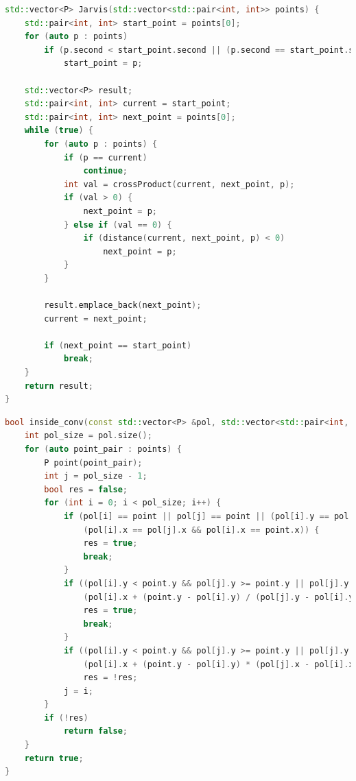 \documentclass[a4paper, 12pt]{article}
\begin{document}
\bigbreak

\begin{lstlisting}[language=C++,caption=Синхронная версия Джарвиса]
std::vector<P> Jarvis(std::vector<std::pair<int, int>> points) {
    std::pair<int, int> start_point = points[0];
    for (auto p : points)
        if (p.second < start_point.second || (p.second == start_point.second && p.first < start_point.first))
            start_point = p;

    std::vector<P> result;
    std::pair<int, int> current = start_point;
    std::pair<int, int> next_point = points[0];
    while (true) {
        for (auto p : points) {
            if (p == current)
                continue;
            int val = crossProduct(current, next_point, p);
            if (val > 0) {
                next_point = p;
            } else if (val == 0) {
                if (distance(current, next_point, p) < 0)
                    next_point = p;
            }
        }

        result.emplace_back(next_point);
        current = next_point;

        if (next_point == start_point)
            break;
    }
    return result;
}
\end{lstlisting}

\newpage
\begin{lstlisting}[language=C++,caption=Проверка вхождения точек в выпуклую оболочку]
bool inside_conv(const std::vector<P> &pol, std::vector<std::pair<int, int>> points) {
    int pol_size = pol.size();
    for (auto point_pair : points) {
        P point(point_pair);
        int j = pol_size - 1;
        bool res = false;
        for (int i = 0; i < pol_size; i++) {
            if (pol[i] == point || pol[j] == point || (pol[i].y == pol[j].y && pol[i].y == point.y) ||
                (pol[i].x == pol[j].x && pol[i].x == point.x)) {
                res = true;
                break;
            }
            if ((pol[i].y < point.y && pol[j].y >= point.y || pol[j].y < point.y && pol[i].y >= point.y) &&
                (pol[i].x + (point.y - pol[i].y) / (pol[j].y - pol[i].y) * (pol[j].x - pol[i].x) == point.x)) {
                res = true;
                break;
            }
            if ((pol[i].y < point.y && pol[j].y >= point.y || pol[j].y < point.y && pol[i].y >= point.y) &&
                (pol[i].x + (point.y - pol[i].y) * (pol[j].x - pol[i].x) / (pol[j].y - pol[i].y) > point.x))
                res = !res;
            j = i;
        }
        if (!res)
            return false;
    }
    return true;
}
\end{lstlisting}
\end{document}
